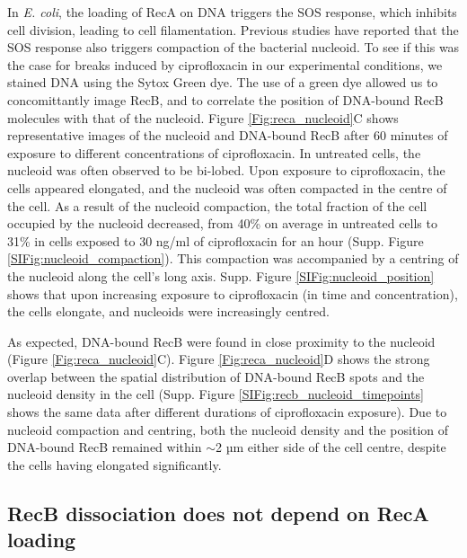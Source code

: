 In \emph{E. coli}, the loading of RecA on DNA triggers the SOS response, which inhibits cell division, leading to cell filamentation. Previous studies have reported that the SOS response also triggers compaction of the bacterial nucleoid.\cite{Odsbu2014} To see if this was the case for breaks induced by ciprofloxacin in our experimental conditions, we stained DNA using the Sytox Green dye. The use of a green dye allowed us to concomittantly image RecB, and to correlate the position of DNA-bound RecB molecules with that of the nucleoid. Figure \ref{Fig:reca_nucleoid}C shows representative images of the nucleoid and DNA-bound RecB after 60 minutes of exposure to different concentrations of ciprofloxacin. In untreated cells, the nucleoid was often observed to be bi-lobed. Upon exposure to ciprofloxacin, the cells appeared elongated, and the nucleoid was often compacted in the centre of the cell. As a result of the nucleoid compaction, the total fraction of the cell occupied by the nucleoid decreased, from 40\% on average in untreated cells to 31\% in cells exposed to 30 ng/ml of ciprofloxacin for an hour (Supp. Figure \ref{SIFig:nucleoid_compaction}). This compaction was accompanied by a centring of the nucleoid along the cell's long axis. Supp. Figure \ref{SIFig:nucleoid_position} shows that upon increasing exposure to ciprofloxacin (in time and concentration), the cells elongate, and nucleoids were increasingly centred.

As expected, DNA-bound RecB were found in close proximity to the nucleoid (Figure \ref{Fig:reca_nucleoid}C). Figure \ref{Fig:reca_nucleoid}D shows the strong overlap between the spatial distribution of DNA-bound RecB spots and the nucleoid density in the cell (Supp. Figure \ref{SIFig:recb_nucleoid_timepoints} shows the same data after different durations of ciprofloxacin exposure). Due to nucleoid compaction and centring, both the nucleoid density and the position of DNA-bound RecB remained within $\sim$2 µm either side of the cell centre, despite the cells having elongated significantly.

\subsection*{RecB dissociation does not depend on RecA loading}

